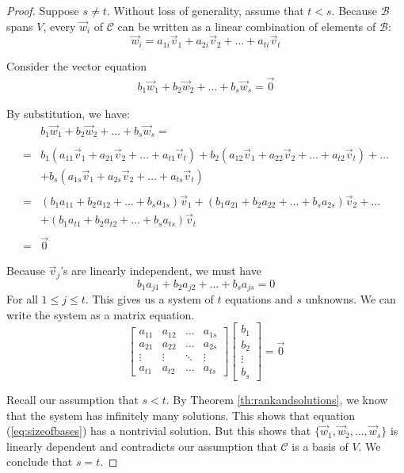 \documentclass{ximera}
\begin{document}
\begin{proof}
Suppose $s\neq t$.  Without loss of generality, assume that $t<s$.  Because $\mathcal{B}$ spans $V$, every $\vec{w}_i$ of $\mathcal{C}$ can be written as a linear combination of elements of $\mathcal{B}$:
$$\vec{w}_i=a_{1i}\vec{v}_1+a_{2i}\vec{v}_{2}+\ldots +a_{ti}\vec{v}_t$$

Consider the vector equation
\begin{align}\label{eq:sizeofbases}
b_1\vec{w}_1+b_2\vec{w}_2+\ldots +b_s\vec{w}_s=\vec{0}
\end{align}

By substitution, we have:
\begin{align*}
    &b_1\vec{w}_1+b_2\vec{w}_2+\ldots +b_s\vec{w}_s=\\ \\
     =&b_1(a_{11}\vec{v}_1+a_{21}\vec{v}_{2}+\ldots +a_{t1}\vec{v}_t)+b_2(a_{12}\vec{v}_1+a_{22}\vec{v}_{2}+\ldots +a_{t2}\vec{v}_t)+\ldots\\
     &+b_s(a_{1s}\vec{v}_1+a_{2s}\vec{v}_{2}+\ldots +a_{ts}\vec{v}_t)\\ \\
     =&(b_1a_{11}+b_2a_{12}+\ldots +b_sa_{1s})\vec{v}_1
+(b_1a_{21}+b_2a_{22}+\ldots +b_sa_{2s})\vec{v}_2+
\ldots \\
&+(b_1a_{t1}+b_2a_{t2}+\ldots +b_sa_{ts})\vec{v}_t\\ \\
=&\vec{0}
\end{align*}

Because $\vec{v}_j$'s are linearly independent, we must have
$$b_1a_{j1}+b_2a_{j2}+\ldots +b_sa_{js}=0$$
For all $1\leq j\leq t$.
This gives us a system of $t$ equations and $s$ unknowns.  We can write the system as a matrix equation.
$$\begin{bmatrix}a_{11}&a_{12}&\ldots &a_{1s}\\a_{21}&a_{22}&\ldots &a_{2s}\\\vdots&\vdots&\ddots&\vdots\\a_{t1}&a_{t2}&\ldots&a_{ts}\end{bmatrix}\begin{bmatrix}b_1\\b_2\\\vdots\\b_s\end{bmatrix}=\vec{0}$$

Recall our assumption that $s<t$.  By Theorem \ref{th:rankandsolutions}, we know that the system has infinitely many solutions.  This shows that equation (\ref{eq:sizeofbases}) has a nontrivial solution.  But this shows that $\{\vec{w}_1, \vec{w}_2,\ldots ,\vec{w}_s\}$ is linearly dependent and contradicts our assumption that $\mathcal{C}$ is a basis of $V$.  We conclude that $s=t$.
\end{proof}
\end{document}
